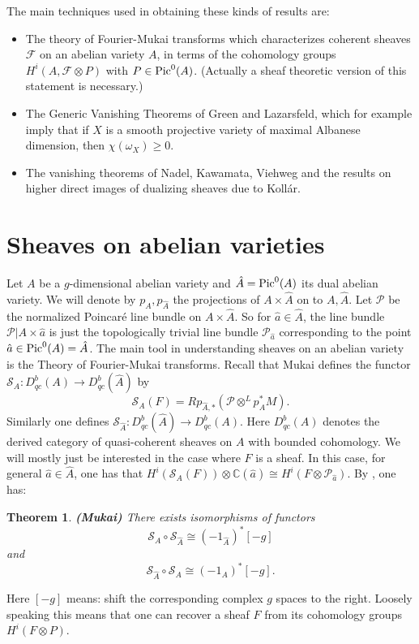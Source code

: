 \documentclass[10pt]{amsart}
\newtheorem{thm}{Theorem}[section]
\newcommand\Pic{{\text{\rm Pic}}}
\newcommand\lra{\longrightarrow}
\newcommand\ot{{\otimes}}
\newcommand\LL{{\mathcal{P}}}
\newcommand\FF{{\mathcal{F}}}
\newcommand\CC{{\mathbb{C}}}
\newcommand\s{{ {\mathcal S}}}
\begin{document}
\bigskip
The main techniques used in obtaining these kinds of results are:

\begin{itemize}

\item The theory of Fourier-Mukai transforms \cite{Mu} which characterizes 
coherent sheaves $\FF$ on an abelian variety $A$, 
in terms of the cohomology groups $H^i(A,\FF \ot P)$ with
$P\in \Pic ^0(A)$. (Actually a sheaf theoretic version of this 
statement is necessary.)

\item The Generic Vanishing Theorems of Green and Lazarsfeld, 
which for example imply
that if $X$ is a smooth projective variety 
of maximal Albanese dimension, then $\chi (\omega _X)\geq 0$.

\item The vanishing theorems of Nadel, Kawamata, Viehweg and the 
results on higher 
direct images of dualizing sheaves due to Koll\'ar.
\end{itemize}
 
\newpage


 \section{Sheaves on abelian varieties}
 Let $A$ be a $g$-dimensional abelian variety and $\hat{A}=\Pic ^0(A)$ its 
dual abelian variety. We will denote by $p_A,p_{\hat {A}}$ the projections
of $A\times \hat{A}$ on to $A,\hat {A}$. Let $\LL $ be the 
normalized Poincar\'e 
line bundle on $A\times \hat {A}$.
So for $\hat {a}\in \hat {A}$, the line bundle $\LL |A\times \hat {a}$
is just the topologically trivial line bundle $\LL _{\hat{a}}$
corresponding to the
point $\hat {a}\in \Pic ^0(A)=\hat{A}$.
The main tool in understanding sheaves on an abelian variety is the 
Theory of Fourier-Mukai transforms. Recall that Mukai defines the 
functor $\s _A :D^b_{qc}(A)\lra D^b_{qc}(\hat {A})$ by
$$\s_A (F)=Rp _{\hat{A},*}(\LL \ot ^L p_A ^*M).$$ 
Similarly 
one defines $\s _{\hat{A}}:D^b_{qc}(\hat {A})\lra D^b_{qc}(A)$.
Here $D^b_{qc}(A)$ denotes the derived category of quasi-coherent sheaves
on $A$ with bounded cohomology. We will mostly just be interested
in the case where $F$ is a sheaf. In this case, for general
$\hat {a} \in \hat {A}$, one has that $H^i(\s _A (F))\ot \CC (\hat {a})
\cong H^i( F\ot \LL _{\hat{a}})$.
 By \cite{Mu}, one has: 
 \begin{thm} \label{mukai} {\bf (Mukai)} There exists isomorphisms of functors
 $$\s _A \circ \s _{\hat {A}}\cong (-1_{\hat{A}})^*[-g]$$
 and
 $$\s _{\hat {A}}\circ \s _A \cong (-1_{{A}})^*[-g].$$
 \end{thm}
Here $[-g]$ means: shift the corresponding complex $g$ spaces to the right.
Loosely speaking this means that one can recover a sheaf $F$ from its 
cohomology groups $H^i(F\ot P)$. 
\end{document}
